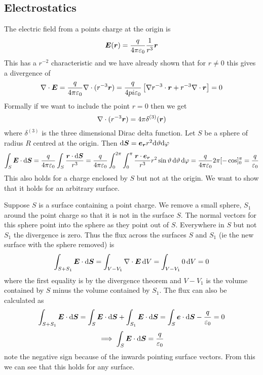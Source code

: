 \documentclass{article}
\begin{document}
    \subsection{Electrostatics}
    The electric field from a points charge at the origin is
    \[\bm{E}(\bm{r}) = \frac{q}{4\pi\varepsilon_0}\frac{1}{r^3}\bm{r}\]
    This has a \(r^{-2}\) characteristic and we have already shown that for \(r \ne 0\) this gives a divergence of
    \[\nabla\cdot\bm{E} = \frac{q}{4\pi\varepsilon_0}\nabla\cdot(r^{-3}\bm{r}) = \frac{q}{4pi\varepsilon_0}\left[\nabla r^{-3}\cdot\bm{r} + r^{-3}\nabla\cdot\bm{r}\right] = 0\]
    Formally if we want to include the point \(r = 0\) then we get
    \[\nabla\cdot(r^{-3}\bm{r}) = 4\pi\delta^{(3)}(\bm{r})\]
    where \(\delta^{(3)}\) is the three dimensional Dirac delta function.
    Let \(S\) be a sphere of radius \(R\) centred at the origin.
    Then \(\dd\bm{S} = \bm{e_{r}} r^2\dd\vartheta\dd\varphi\)
    \[\int_S\bm{E}\cdot\dd\bm{S} = \frac{q}{4\pi\varepsilon_0}\int_S\frac{\bm{r}\cdot\dd\bm{S}}{r^3} = \frac{q}{4\pi\varepsilon_0}\int_0^{2\pi}\int_0^{\pi}\frac{\bm{r}\cdot\bm{e_{r}}}{r^3}r^2\sin\vartheta\,\dd\vartheta\,\dd\varphi = \frac{q}{4\pi\varepsilon_0}2\pi[-\cos]_0^{\pi} = \frac{q}{\varepsilon_0}\]
    This also holds for a charge enclosed by \(S\) but not at the origin.
    We want to show that it holds for an arbitrary surface.
    
    Suppose \(S\) is a surface containing a point charge.
    We remove a small sphere, \(S_1\) around the point charge so that it is not in the surface \(S\).
    The normal vectors for this sphere point into the sphere as they point out of \(S\).
    Everywhere in \(S\) but not \(S_1\) the divergence is zero.
    Thus the flux across the surfaces \(S\) and \(S_1\) (ie the new surface with the sphere removed) is
    \[\int_{S+S_1} \bm{E}\cdot\dd\bm{S} = \int_{V - V_1}\nabla\cdot\bm{E}\,\dd V = \int_{V-V_1}0\,\dd V = 0\]
    where the first equality is by the divergence theorem and \(V - V_1\) is the volume contained by \(S\) minus the volume contained by \(S_1\).
    The flux can also be calculated as
    \[\int_{S+S_1}\bm{E}\cdot\dd\bm{S} = \int_S\bm{E}\cdot\dd\bm{S} + \int_{S_1}\bm{E}\cdot\dd\bm{S} = \int_S\bm{e}\cdot\dd\bm{S} - \frac{q}{\varepsilon_0} = 0\]
    \[\implies \int_S\bm{E}\cdot\dd\bm{S} = \frac{q}{\varepsilon_0}\]
    note the negative sign because of the inwards pointing surface vectors.
    From this we can see that this holds for any surface.
    
\end{document}
